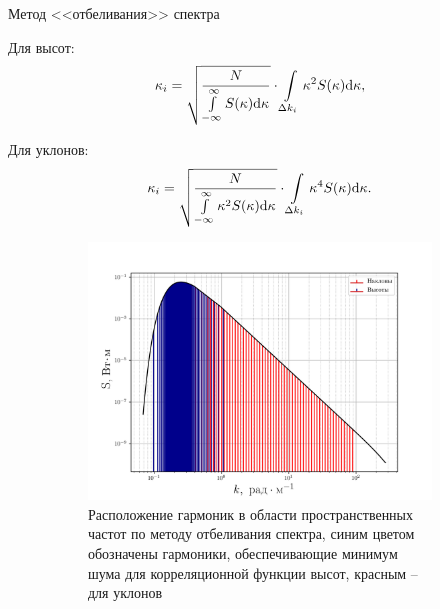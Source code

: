 \documentclass[10pt,pdf,hyperref={unicode}, dvipsnames]{beamer}
\begin{document}
\begin{frame}[t]{Метод <<отбеливания>> спектра}
\begin{minipage}{0.49\linewidth}
    \centering
    Для высот:
\begin{equation}
    \footnotesize
    \kappa_i = \sqrt{\frac{N}{\int\limits_{-\infty}^{\infty} S(\kappa)
    \dd \kappa}} \cdot \int\limits_{\Delta k_i} \kappa^2
        S(\kappa) \dd \kappa, 
\end{equation}

\end{minipage}
\hfill
\begin{minipage}{0.45\linewidth}
    \centering
    Для уклонов: 
\begin{equation}
    \footnotesize
    \kappa_i = \sqrt{\frac{N}{\int\limits_{-\infty}^{\infty} \kappa^2 S(\kappa)
    \dd \kappa}} \cdot \int\limits_{\Delta k_i} \kappa^4
        S(\kappa) \dd \kappa. 
\end{equation}
\end{minipage}
\begin{figure}[h!]
    \begin{subfigure}{0.45\linewidth}
        \includegraphics[width=\linewidth]{fig/fig3}
        \caption*{\footnotesize Расположение гармоник в области пространственных частот по
        методу отбеливания спектра, синим цветом обозначены гармоники,
    обеспечивающие минимум шума для корреляционной функции высот, красным --
для уклонов}
    \end{subfigure}
    \hfill
    \begin{subfigure}{0.49\linewidth}

\end{subfigure}
\end{figure}
\end{frame}
\end{document}
